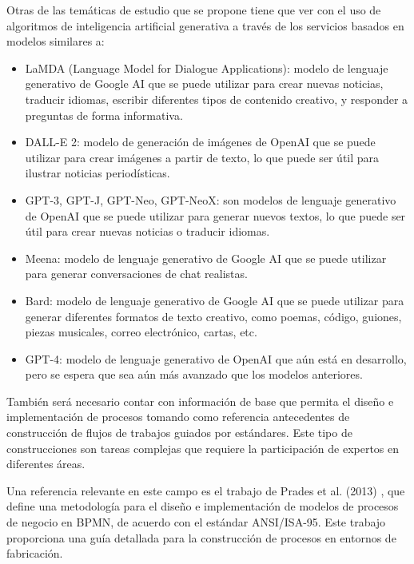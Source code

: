 \documentclass[12pt]{article}
\begin{document}


Otras de las temáticas de estudio que se propone tiene que ver con el uso de algoritmos de inteligencia artificial generativa a través de los servicios basados en modelos similares a:  


\begin{itemize}
    \item LaMDA (Language Model for Dialogue Applications): modelo de lenguaje generativo de Google AI que se puede utilizar para crear nuevas noticias, traducir idiomas, escribir diferentes tipos de contenido creativo, y responder a preguntas de forma informativa.
    \item DALL-E 2: modelo de generación de imágenes de OpenAI que se puede utilizar para crear imágenes a partir de texto, lo que puede ser útil para ilustrar noticias periodísticas.
    \item GPT-3, GPT-J, GPT-Neo, GPT-NeoX: son modelos de lenguaje generativo de OpenAI que se puede utilizar para generar nuevos textos, lo que puede ser útil para crear nuevas noticias o traducir idiomas.
    \item Meena: modelo de lenguaje generativo de Google AI que se puede utilizar para generar conversaciones de chat realistas.
    \item Bard: modelo de lenguaje generativo de Google AI que se puede utilizar para generar diferentes formatos de texto creativo, como poemas, código, guiones, piezas musicales, correo electrónico, cartas, etc.
    \item GPT-4: modelo de lenguaje generativo de OpenAI que aún está en desarrollo, pero se espera que sea aún más avanzado que los modelos anteriores. 
\end{itemize}

También será necesario contar con información de base que permita el diseño e implementación de procesos tomando como referencia antecedentes de construcción de flujos de trabajos guiados por estándares. Este tipo de construcciones son tareas complejas que requiere la participación de expertos en diferentes áreas. 

Una referencia relevante en este campo es el trabajo de Prades et al. (2013) \cite{PRADES2013115}, que define una metodología para el diseño e implementación de modelos de procesos de negocio en BPMN, de acuerdo con el estándar ANSI/ISA-95. Este trabajo proporciona una guía detallada para la construcción de procesos en entornos de fabricación.
\end{document}
